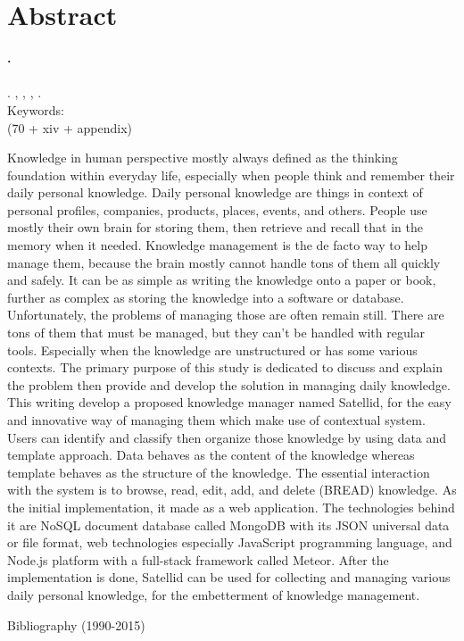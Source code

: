 
\begingroup
\let\clearpage\relax
\let\cleardoublepage\relax

\label{chap:abstract}
\chapter{Abstract}

\textbf{\myName.} \myNPM \\
\textbf{\myTitle} \\
\textbf{\myThesisType}. \myDepartmentLong, \myFacultyLong, \myUni, \myYear. \\
Keywords: \myKeywords \\
(70 + xiv + appendix)

\hfill

\singlespacing

Knowledge in human perspective mostly always defined as the thinking foundation within everyday life,
especially when people think and remember their daily personal knowledge.
Daily personal knowledge are things in context of personal profiles, companies, products, places, events, and others.
People use mostly their own brain for storing them, then retrieve and recall that in the memory when it needed.
Knowledge management is the de facto way to help manage them, because the brain mostly cannot handle tons of them all quickly and safely.
It can be as simple as writing the knowledge onto a paper or book, further as complex as storing the knowledge into a software or database.
Unfortunately, the problems of managing those are often remain still.
There are tons of them that must be managed, but they can’t be handled with regular tools.
Especially when the knowledge are unstructured or has some various contexts.
The primary purpose of this study is dedicated to discuss and explain the problem then provide and develop the solution in managing daily knowledge.
This writing develop a proposed knowledge manager named Satellid, for the easy and innovative way of managing them which make use of contextual system.
Users can identify and classify then organize those knowledge by using data and template approach.
Data behaves as the content of the knowledge whereas template behaves as the structure of the knowledge.
The essential interaction with the system is to browse, read, edit, add, and delete (BREAD) knowledge.
As the initial implementation, it made as a web application.
The technologies behind it are NoSQL document database called MongoDB with its JSON universal data or file format, web technologies especially JavaScript programming language, and Node.js platform with a full-stack framework called Meteor.
After the implementation is done, Satellid can be used for collecting and managing various daily personal knowledge, for the embetterment of knowledge management.

\onehalfspacing

\hfill


\noindent Bibliography (1990-2015)



\endgroup

\vfill
